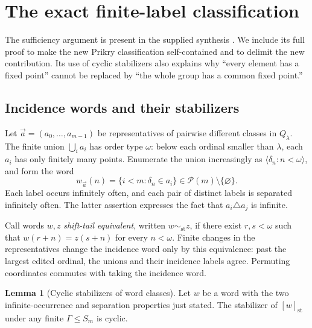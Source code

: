 \documentclass[11pt,letterpaper]{article}
\theoremstyle{definition}
\newtheorem{lemma}[definition]{Lemma}
\numberwithin{equation}{section}
\newcommand{\Pow}{\mathcal P}
\newcommand{\wordeq}{\mathrel{\sim_{\mathrm{st}}}}
\newcommand{\seq}[1]{\langle #1\rangle}
\begin{document}
\section{The exact finite-label classification}\label{sec:classification}

The sufficiency argument is present in the supplied synthesis
\cite[Section~12.5]{archive}. We include its full proof to make the new
Prikry classification self-contained and to delimit the new contribution.
Its use of cyclic stabilizers also explains why ``every element has a fixed
point'' cannot be replaced by ``the whole group has a common fixed point.''

\subsection{Incidence words and their stabilizers}

Let $\vec a=(a_0,\ldots,a_{m-1})$ be representatives of pairwise different
classes in $Q_\lambda$. The finite union $\bigcup_i a_i$ has order type
$\omega$: below each ordinal smaller than $\lambda$, each $a_i$ has only
finitely many points. Enumerate the union increasingly as
$\seq{\delta_n:n<\omega}$, and form the word
\[
                  w_{\vec a}(n)=\{i<m:\delta_n\in a_i\}
                  \in\Pow(m)\setminus\{\varnothing\}.
\]
Each label occurs infinitely often, and each pair of distinct labels is
separated infinitely often. The latter assertion expresses the fact that
$a_i\triangle a_j$ is infinite.

Call words $w,z$ \emph{shift-tail equivalent}, written $w\wordeq z$, if
there exist $r,s<\omega$ such that
$w(r+n)=z(s+n)$ for every $n<\omega$. Finite changes in the representatives
change the incidence word only by this equivalence: past the largest edited
ordinal, the unions and their incidence labels agree. Permuting coordinates
commutes with taking the incidence word.

\begin{lemma}[Cyclic stabilizers of word classes]\label{lem:stabilizer}
Let $w$ be a word with the two infinite-occurrence and separation properties
just stated. The stabilizer of $[w]_{\mathrm{st}}$ under any finite
$\Gamma\le S_m$ is cyclic.
\end{lemma}
\end{document}
